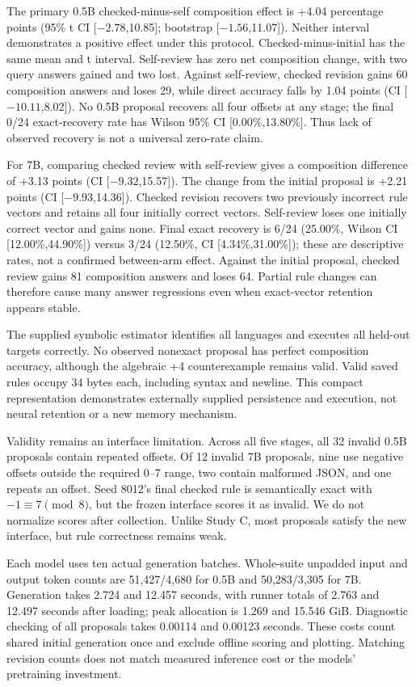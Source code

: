 \documentclass[11pt]{article}
\begin{document}
The primary 0.5B checked-minus-self composition effect is +4.04 percentage
points (95\% t CI [$-2.78$,10.85]; bootstrap [$-1.56$,11.07]). Neither interval
demonstrates a positive effect under this protocol. Checked-minus-initial has
the same mean and t interval. Self-review has zero net composition change,
with two query answers gained and two lost. Against self-review, checked
revision gains 60 composition answers and loses 29, while direct accuracy
falls by 1.04 points (CI [$-10.11$,8.02]). No 0.5B proposal recovers all four
offsets at any stage; the final 0/24 exact-recovery rate has Wilson 95\% CI
[0.00\%,13.80\%]. Thus lack of observed recovery is not a universal zero-rate
claim.

For 7B, comparing checked review with self-review gives a composition difference
of +3.13 points (CI [$-9.32$,15.57]). The change from the initial proposal is
+2.21 points (CI [$-9.93$,14.36]). Checked revision recovers two previously incorrect rule
vectors and retains all four initially correct vectors. Self-review loses one
initially correct vector and gains none. Final exact recovery is 6/24
(25.00\%, Wilson CI [12.00\%,44.90\%]) versus 3/24
(12.50\%, CI [4.34\%,31.00\%]); these are descriptive rates, not a confirmed
between-arm effect. Against the initial proposal, checked review gains 81
composition answers and loses 64. Partial rule changes can therefore cause
many answer regressions even when exact-vector retention appears stable.

The supplied symbolic estimator identifies all languages and executes all
held-out targets correctly. No observed nonexact proposal has perfect
composition accuracy, although the algebraic +4 counterexample remains valid.
Valid saved rules occupy 34 bytes each, including syntax and newline. This
compact representation demonstrates externally supplied persistence and
execution, not neural retention or a new memory mechanism.

Validity remains an interface limitation. Across all five stages, all 32
invalid 0.5B proposals contain repeated offsets. Of 12 invalid 7B proposals,
nine use negative offsets outside the required 0--7 range, two contain
malformed JSON, and one repeats an offset. Seed 8012's final checked rule
is semantically exact with $-1\equiv7\pmod8$, but the frozen interface scores
it as invalid. We do not normalize scores after collection. Unlike Study C,
most proposals satisfy the new interface, but rule correctness remains weak.

Each model uses ten actual generation batches. Whole-suite unpadded input
and output token counts are 51,427/4,680 for 0.5B and 50,283/3,305 for 7B.
Generation takes 2.724 and 12.457 seconds, with runner totals of 2.763 and
12.497 seconds after loading; peak allocation is 1.269 and 15.546 GiB.
Diagnostic checking of all proposals takes 0.00114 and 0.00123 seconds.
These costs count shared initial generation once and exclude offline scoring
and plotting. Matching revision counts does not match measured inference cost
or the models' pretraining investment.
\end{document}
